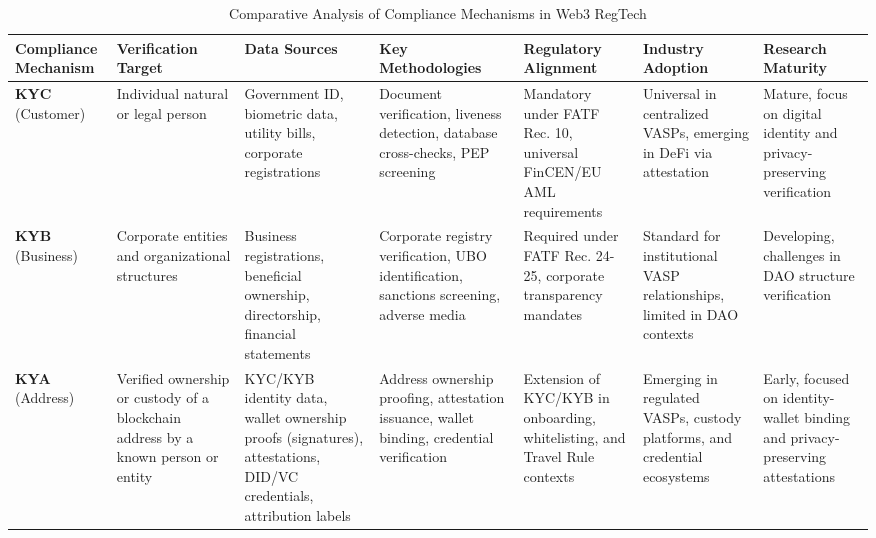 \begin{table}[t]
\centering
\caption{Comparative Analysis of Compliance Mechanisms in Web3 RegTech}
\label{tab:compliance_comparison}
\scriptsize
\begin{tabularx}{\textwidth}{XXXXp{2.35cm}XX}
\toprule
\textbf{Compliance Mechanism} & \textbf{Verification Target} & \textbf{Data Sources} & \textbf{Key Methodologies} & \textbf{Regulatory Alignment} & \textbf{Industry Adoption} & \textbf{Research Maturity} \\
\midrule
\textbf{KYC} (Customer) & Individual natural or legal person \cite{financialactiontaskforcefatf2012internationalstandardscombating} & Government ID, biometric data, utility bills, corporate registrations & Document verification, liveness detection, database cross-checks, PEP screening \cite{charoenwong2024regtechtechnologydrivencompliance} & Mandatory under FATF Rec. 10, universal FinCEN/EU AML requirements \cite{force2021updatedguidanceriskbased} & Universal in centralized VASPs, emerging in DeFi via attestation & Mature, focus on digital identity and privacy-preserving verification \cite{reed2022decentralizedidentifiersdids,yang2024researchidentitydata} \\
\midrule
\textbf{KYB} (Business) & Corporate entities and organizational structures \cite{financialactiontaskforcefatf2012internationalstandardscombating} & Business registrations, beneficial ownership, directorship, financial statements & Corporate registry verification, UBO identification, sanctions screening, adverse media & Required under FATF Rec. 24-25, corporate transparency mandates \cite{force2021updatedguidanceriskbased} & Standard for institutional VASP relationships, limited in DAO contexts \cite{voshmgir2020tokeneconomyhow} & Developing, challenges in DAO structure verification \cite{werbach2018trustverifywhy} \\
\midrule
\textbf{KYA} (Address) & Verified ownership or custody of a blockchain address by a known person or entity & KYC/KYB identity data, wallet ownership proofs (signatures), attestations, DID/VC credentials, attribution labels & Address ownership proofing, attestation issuance, wallet binding, credential verification \cite{reed2022decentralizedidentifiersdids,camenisch2001efficientsystemnontransferable} & Extension of KYC/KYB in onboarding, whitelisting, and Travel Rule contexts & Emerging in regulated VASPs, custody platforms, and credential ecosystems & Early, focused on identity-wallet binding and privacy-preserving attestations \cite{yang2024researchidentitydata} \\

\end{tabularx}
\end{table}
